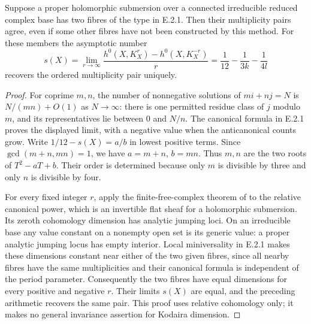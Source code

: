 \begin{proposition}\label{push:src:E.2.3}
Suppose a proper holomorphic submersion over a connected
irreducible reduced complex base has two fibres of the type
in E.2.1.  Then their multiplicity pairs agree, even if some
other fibres have not been constructed by this method.
For these members the asymptotic number
\[
 s(X)=\lim_{r\to\infty}
 \frac{h^0(X,K_X^r)-h^0(X,K_X^{-r})}{r}
 =\frac1{12}-\frac1{3k}-\frac1{4l}
\]
recovers the ordered multiplicity pair uniquely.
\end{proposition}
\begin{proof}
For coprime $m,n$, the number of nonnegative solutions of
$mi+nj=N$ is $N/(mn)+O(1)$ as $N\to\infty$:
there is one permitted residue class of $j$ modulo $m$, and
its representatives lie between $0$ and $N/n$.
The canonical formula in E.2.1 proves the displayed limit,
with a negative value when the anticanonical counts grow.
Write $1/12-s(X)=a/b$ in lowest positive terms.
Since $\gcd(m+n,mn)=1$, we have $a=m+n$, $b=mn$.
Thus $m,n$ are the two roots of $T^2-aT+b$.
Their order is determined because only $m$ is divisible by
three and only $n$ is divisible by four.

For every fixed integer $r$, apply the finite-free-complex
theorem of \cite[Chapter III, Theorem 4.1]{BS76push} to
the relative canonical power, which is an invertible flat
sheaf for a holomorphic submersion.  Its zeroth cohomology
dimension has analytic jumping loci.  On an irreducible
base any value constant on a nonempty open set is its
generic value: a proper analytic jumping locus has empty
interior.  Local miniversality in E.2.1 makes these dimensions
constant near either of the two given fibres, since all
nearby fibres have the same multiplicities and their
canonical formula is independent of the period parameter.
Consequently the two fibres have equal dimensions for
every positive and negative $r$.  Their limits $s(X)$
are equal, and the preceding arithmetic recovers the same
pair.  This proof uses relative cohomology only; it makes
no general invariance assertion for Kodaira dimension.
\end{proof}

